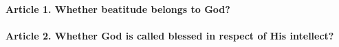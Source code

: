 \documentclass{ucetd}
\begin{document}
\paragraph{Article 1. Whether beatitude belongs to God?}
\paragraph{Article 2. Whether God is called blessed in respect of His intellect?}
\end{document}
